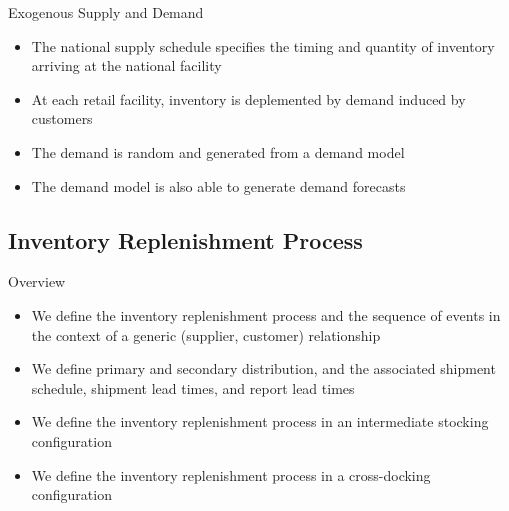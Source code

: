 \documentclass{beamer}
\begin{document}
\begin{frame}{Exogenous Supply and Demand}
\begin{itemize}
\item The national supply schedule specifies
the timing and quantity of inventory arriving at the national facility
\item At each retail facility,
inventory is deplemented by demand induced by customers
\item The demand is random and generated from a demand model
\item The demand model is also able to generate demand forecasts
\end{itemize}
\end{frame}





\subsection{Inventory Replenishment Process}

\begin{frame}{Overview}
\begin{itemize}
\item We define the inventory replenishment process
  and the sequence of events
  in the context of a generic (supplier, customer) relationship
\item We define primary and secondary distribution,
  and the associated shipment schedule, shipment lead times,
  and report lead times
\item We define the inventory replenishment process
  in an intermediate stocking configuration
\item We define the inventory replenishment process
  in a cross-docking configuration
\end{itemize}
\end{frame}
\end{document}
